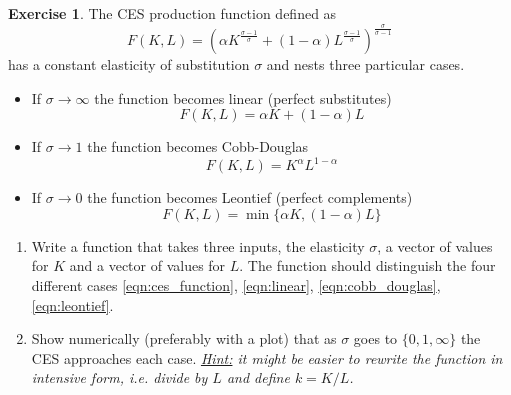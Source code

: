 \documentclass[a4paper,11pt]{article}
\theoremstyle{definition}
\newtheorem{exercise}{Exercise}
\begin{document}
\begin{exercise}
The CES production function defined as
\begin{equation}
F(K, L) = \left(\alpha K^{\frac{\sigma - 1}{\sigma}} + (1 - \alpha) L^{\frac{\sigma - 1}{\sigma}}\right)^{\frac{\sigma}{\sigma - 1}}
\label{eqn:ces_function}
\end{equation}
has a constant elasticity of substitution $\sigma$ and nests three particular cases. 
\begin{itemize}
    \item If $\sigma\rightarrow\infty$ the function becomes linear (perfect substitutes)
    \begin{equation}
    F(K,L) = \alpha K + (1 - \alpha)L
    \label{eqn:linear}
    \end{equation}
    \item If $\sigma\rightarrow 1$ the function becomes Cobb-Douglas
    \begin{equation}
    F(K,L) = K^{\alpha}L^{1-\alpha}
    \label{eqn:cobb_douglas}
    \end{equation}
    \item If $\sigma\rightarrow 0$ the function becomes Leontief (perfect complements)
    \begin{equation}
    F(K,L) = \min\{\alpha K, (1-\alpha)L\}
    \label{eqn:leontief}
    \end{equation}
\end{itemize}

\begin{enumerate}
    \item Write a function that takes three inputs, the elasticity $\sigma$, a vector of values for $K$ and a vector of values for $L$. The function should distinguish the four different cases \eqref{eqn:ces_function}, \eqref{eqn:linear}, \eqref{eqn:cobb_douglas}, \eqref{eqn:leontief}.
    \item Show numerically (preferably with a plot) that as $\sigma$ goes to $\{0, 1, \infty\}$ the CES approaches each case. \textit{\underline{Hint:} it might be easier to rewrite the function in intensive form, i.e. divide by $L$ and define $k = K/L$.}
\end{enumerate}
\end{exercise}
\end{document}
